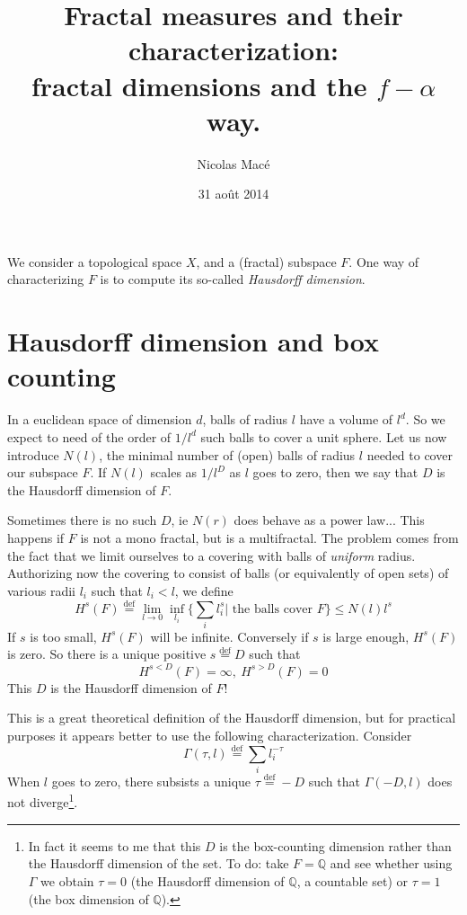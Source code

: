 \documentclass[11pt]{article}
\title{\textbf{Fractal measures and their characterization:} \\ fractal dimensions and the $f-\alpha$ way.}
\author{Nicolas Macé}
\date{31 août 2014}
\newcommand{\define}{\ensuremath{ \overset{\text{def}}{=} }}
\begin{document}

\maketitle

We consider a topological space $X$, and a (fractal) subspace $F$.
One way of characterizing $F$ is to compute its so-called \emph{Hausdorff dimension}.

\section{Hausdorff dimension and box counting}

In a euclidean space of dimension $d$, balls of radius $l$ have a volume of $l^d$. 
So we expect to need of the order of $1/l^d$ such balls to cover a unit sphere. 
Let us now introduce $N(l)$, the minimal number of (open) balls of radius $l$ needed to cover our subspace $F$. If $N(l)$ scales as $1/l^D$ as $l$ goes to zero, then we say that $D$ is the Hausdorff dimension of $F$.

Sometimes there is no such $D$, ie $N(r)$ does behave as a power law... This happens if $F$ is not a mono fractal, but is a multifractal.
The problem comes from the fact that we limit ourselves to a covering with balls of \emph{uniform} radius. Authorizing now the covering to consist of balls (or equivalently of open sets) of various radii $l_i$ such that  $l_i < l$, we define
\begin{equation}
	H^s(F) \define \lim_{l \rightarrow 0} \inf_{l_i} \Big\{ \sum_i l_i^s \Big| \text{~the balls cover $F$} \Big\} \leq N(l) l^s
\end{equation}
If $s$ is too small, $H^s(F)$ will be infinite. Conversely if $s$ is large enough, $H^s(F)$ is zero. So there is a unique positive $s \define D$ such that 
\begin{equation}
	H^{s < D}(F) = \infty, ~ H^{s > D}(F) = 0
\end{equation}
This $D$ is the Hausdorff dimension of $F$!

This is a great theoretical definition of the Hausdorff dimension, but for practical purposes it appears better to use the following characterization. Consider
\begin{equation}
	\Gamma(\tau,l) \define \sum_i l_i^{-\tau}
\end{equation}
When $l$ goes to zero, there subsists a unique $\tau \define -D$ such that $\Gamma(-D,l)$ does not diverge\footnote{In fact it seems to me that this $D$ is the box-counting dimension rather than the Hausdorff dimension of the set. To do: take $F = \mathbb{Q}$ and see whether using $\Gamma$ we obtain $\tau=0$ (the Hausdorff dimension of $\mathbb{Q}$, a countable set) or $\tau=1$ (the box dimension of $\mathbb{Q}$).}.
\end{document}
